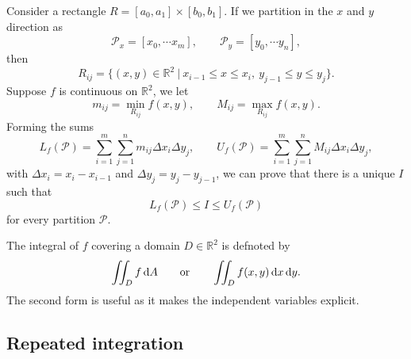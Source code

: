 \documentclass[letter-paper]{tufte-book}
\begin{document}
Consider a rectangle $R = [a_0,a_1]\times[b_0,b_1]$. If we partition in the $x$
and $y$ direction as
\begin{equation*}
  \mathcal{P}_x = [x_0,\cdots x_m],\qquad \mathcal{P}_y = [y_0,\cdots y_n],
\end{equation*}
then
\begin{equation*}
  R_{ij} = \{(x,y)\in\mathbb{R}^2\ |\ x_{i-1} \leq x \leq x_i,\ 
  y_{j-1} \leq y \leq y_j\}.
\end{equation*}
Suppose $f$ is continuous on $\mathbb{R}^2$, we let
\begin{equation*}
  m_{ij} = \min_{R_{ij}} f(x,y),\qquad M_{ij} = \max_{R_{ij}} f(x,y).
\end{equation*}
Forming the sums
\begin{equation*}
  L_{f}(\mathcal{P}) = \sum_{i=1}^m \sum_{j=1}^n m_{ij}\Delta x_i \Delta y_j,
  \qquad
  U_{f}(\mathcal{P}) = \sum_{i=1}^m \sum_{j=1}^n M_{ij}\Delta x_i \Delta y_j,
\end{equation*}
with $\Delta x_i = x_i - x_{i-1}$ and $\Delta y_j = y_j - y_{j-1}$, we can prove
that there is a unique $I$ such that
\begin{equation*}
  L_{f}(\mathcal{P}) \leq I \leq U_{f}(\mathcal{P})
\end{equation*}
for every partition $\mathcal{P}$.

The integral of $f$ covering a domain $D\in\mathbb{R}^2$ is defnoted by
\begin{equation*}
  \iint_D f\, \mathrm{d}A \qquad\textnormal{or}\qquad
  \iint_D f(x,y)\, \mathrm{d}x\,\mathrm{d}y.
\end{equation*}
The second form is useful as it makes the independent variables explicit.

\subsection{Repeated integration}
\end{document}
